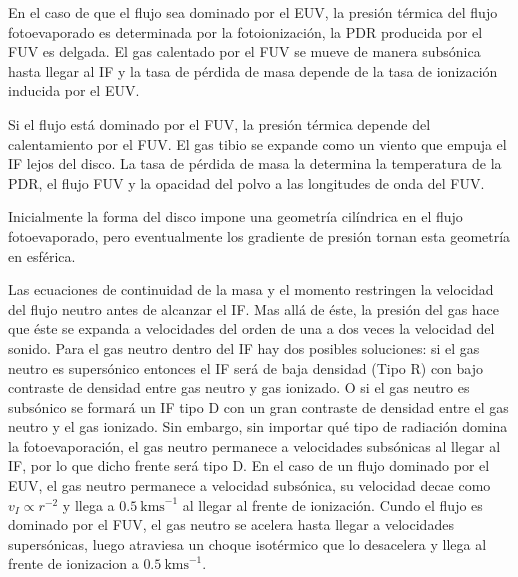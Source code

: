 En el caso de que el flujo sea dominado por el EUV, la presión térmica del
flujo fotoevaporado es determinada por la fotoionización, la PDR producida
por el FUV es delgada. El gas calentado por el FUV se mueve de manera
subsónica hasta llegar al IF y la tasa de pérdida de masa
depende de la tasa de ionización inducida por el EUV.

Si el flujo está dominado por el FUV, la presión térmica depende del
calentamiento por el FUV. El gas tibio se expande como un viento que empuja
el IF lejos del disco. La tasa de pérdida de masa la determina la temperatura
de la PDR, el flujo FUV y la opacidad del polvo a las longitudes de onda del FUV.

Inicialmente la forma del disco impone una geometría cilíndrica en el
flujo fotoevaporado, pero eventualmente los gradiente de presión tornan
esta geometría en esférica.

Las ecuaciones de continuidad de la masa y el momento restringen la velocidad
del flujo neutro antes de alcanzar el IF. Mas allá de éste, la presión del
gas hace que éste se expanda a velocidades del orden de una a dos veces la
velocidad del sonido. Para el gas neutro dentro del IF hay dos posibles
soluciones: si el gas neutro es supersónico entonces el IF será de baja
densidad (Tipo R) con bajo contraste de densidad entre gas neutro y
gas ionizado. O si el gas neutro es subsónico se formará un IF tipo D con un
gran contraste de densidad entre el gas neutro y el gas ionizado. Sin embargo,
sin importar qué tipo de radiación domina la fotoevaporación, el gas neutro
permanece a velocidades subsónicas al llegar al IF, por lo que dicho frente
será tipo D. 
En el caso de un flujo dominado por el EUV, el gas neutro permanece a
velocidad subsónica, su velocidad decae como $v_I \propto r^{-2}$ y llega
a $0.5~\mathrm{kms}^{-1}$ al llegar al frente de ionización. Cundo el flujo es
dominado por el FUV, el gas neutro se acelera hasta llegar a velocidades
supersónicas, luego atraviesa un choque isotérmico que lo desacelera y
llega al frente de ionizacion a $0.5~\mathrm{kms}^{-1}$.


